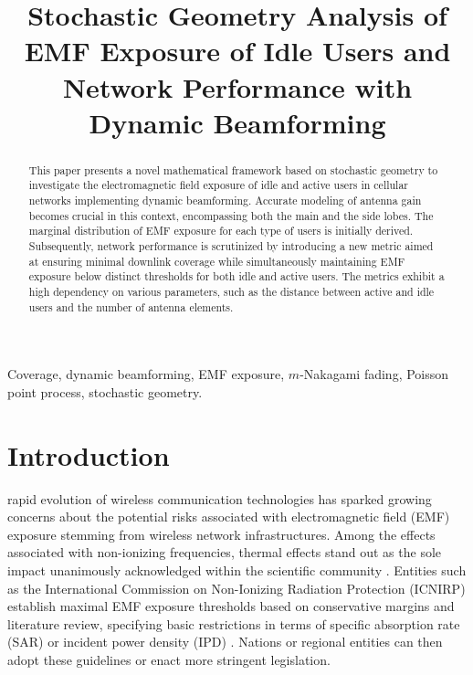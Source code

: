
\title{Stochastic Geometry Analysis of EMF Exposure of Idle Users and Network Performance with Dynamic Beamforming}
\maketitle
\begin{abstract}
This paper presents a novel mathematical framework based on stochastic geometry to investigate the electromagnetic field exposure of idle and active users in cellular networks implementing dynamic beamforming. Accurate modeling of antenna gain becomes crucial in this context, encompassing both the main and the side lobes. The marginal distribution of EMF exposure for each type of users is initially derived. Subsequently, network performance is scrutinized by introducing a new metric aimed at ensuring minimal downlink coverage while simultaneously maintaining EMF exposure below distinct thresholds for both idle and active users. The metrics exhibit a high dependency on various parameters, such as the distance between active and idle users and the number of antenna elements.
\end{abstract}

\begin{IEEEkeywords}
Coverage, dynamic beamforming, EMF exposure, $m$-Nakagami fading, Poisson point process, stochastic geometry.
\end{IEEEkeywords}

\section{Introduction}

 rapid evolution of wireless communication technologies has sparked growing concerns about the potential risks associated with electromagnetic field (EMF) exposure stemming from wireless network infrastructures. Among the effects associated with non-ionizing frequencies, thermal effects stand out as the sole impact unanimously acknowledged within the scientific community \cite{rumney19}. Entities such as the International Commission on Non-Ionizing Radiation Protection (ICNIRP) establish maximal EMF exposure thresholds based on conservative margins and literature review, specifying basic restrictions in terms of specific absorption rate (SAR) or incident power density (IPD) \cite{icnirp2020}. Nations or regional entities can then adopt these guidelines or enact more stringent legislation.

